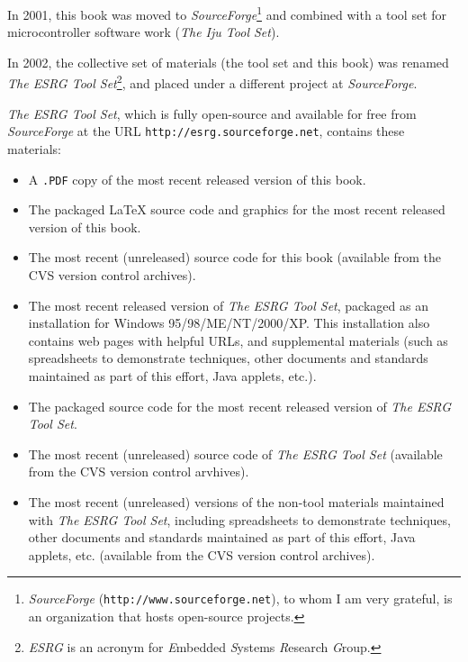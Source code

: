 \documentclass[letterpaper,10pt,titlepage]{custbook}
\begin{document}
In 2001, this book was moved to 
\emph{SourceForge}\footnote{\emph{SourceForge}
(\texttt{http://www.sourceforge.net}), to whom I am very grateful,
is an organization that hosts open-source projects.} and
combined with a tool
set for microcontroller software work 
(\emph{The Iju Tool Set}).

In 2002, the collective set of materials (the tool set and this book) 
was renamed \emph{The ESRG Tool Set}\footnote{\emph{ESRG}
is an acronym for \emph{E}mbedded \emph{S}ystems \emph{R}esearch \emph{G}roup.}, 
and placed under a different
project at \emph{SourceForge}.

\emph{The ESRG Tool Set}, which is fully open-source and 
available for free from \emph{SourceForge} at the URL
\texttt{http://esrg.sourceforge.net}, contains 
these materials: 

\begin{itemize} 
\item A \texttt{.PDF} copy of the most recent released
      version of this book.

\item The packaged \LaTeX{} source code and graphics
      for the most recent released
      version of this book.

\item The most recent (unreleased) source code for this book
      (available from the CVS version control archives).

\item The most recent released version of 
      \emph{The ESRG Tool Set}, packaged as an installation
      for Windows 95/98/ME/NT/2000/XP.  This installation also
	  contains web pages with helpful URLs, and supplemental
	  materials (such as spreadsheets to demonstrate techniques,
	  other documents and standards maintained as part of this
	  effort,
	  Java applets, etc.).

\item The packaged source code for the most recent released
      version of \emph{The ESRG Tool Set}.

\item The most recent (unreleased) source code of
      \emph{The ESRG Tool Set} (available from the CVS
      version control arvhives).

\item The most recent (unreleased) versions of the non-tool
      materials maintained with \emph{The ESRG Tool Set}, including
	  spreadsheets to demonstrate techniques, other
      documents and standards maintained as part of this
	  effort, Java applets, etc. (available from the CVS version control
	  archives).
\end{itemize} 
\end{document}
